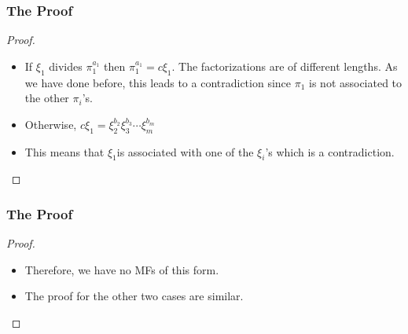 \begin{frame}
  \frametitle{The Proof}
  \begin{proof}
    \begin{itemize}
      \item<1-> If $\xi_{1}$ divides $\pi_{1}^{a_{1}}$ then $\pi_{1}^{a_{1}}=c\xi_{1}$.
	The factorizations are of different lengths.
	As we have done before, this leads to a contradiction since $\pi_{1}$ is not associated to the other $\pi_{i}$'s. 
      \item<2-> Otherwise, $c\xi_{1}=\xi_{2}^{b_{2}}\xi_{3}^{b_{3}}\cdots\xi_{m}^{b_{m}}$
      \item<3-> This means that $\xi_{1}$is associated with one of the $\xi_{i}$'s which is a contradiction.
    \end{itemize}
    \noqedsymbol
  \end{proof}
\end{frame}

\begin{frame}
  \frametitle{The Proof}
  \begin{proof}
    \begin{itemize}
      \item<1-> Therefore, we have no MFs of this form.
      \item<2-> The proof for the other two cases are similar. 
    \end{itemize}
  \end{proof}
\end{frame}
